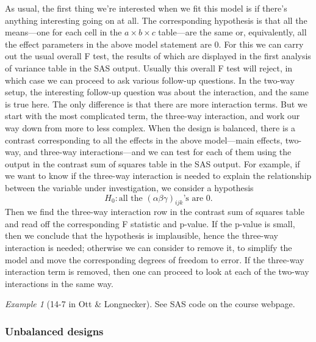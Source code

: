 \documentclass[a4paper, 12pt]{article}
\theoremstyle{plain}
\theoremstyle{definition}
\theoremstyle{remark}
\newtheorem*{example}{Example}
\begin{document}
As usual, the first thing we're interested when we fit this model is if there's anything interesting going on at all.  The corresponding hypothesis is that all the means---one for each cell in the $a \times b \times c$ table---are the same or, equivalently, all the effect parameters in the above model statement are 0.  For this we can carry out the usual overall F test, the results of which are displayed in the first analysis of variance table in the SAS output.  Usually this overall F test will reject, in which case we can proceed to ask various follow-up questions.  In the two-way setup, the interesting follow-up question was about the interaction, and the same is true here.  The only difference is that there are more interaction terms.  But we start with the most complicated term, the three-way interaction, and work our way down from more to less complex.  When the design is balanced, there is a contrast corresponding to all the effects in the above model---main effects, two-way, and three-way interactions---and we can test for each of them using the output in the contrast sum of squares table in the SAS output.  For example, if we want to know if the three-way interaction is needed to explain the relationship between the variable under investigation, we consider a hypothesis 
\[ H_0: \text{all the $(\alpha\beta\gamma)_{ijk}$'s are 0}. \]
Then we find the three-way interaction row in the contrast sum of squares table and read off the corresponding F statistic and p-value.  If the p-value is small, then we conclude that the hypothesis is implausible, hence the three-way interaction is needed; otherwise we can consider to remove it, to simplify the model and move the corresponding degrees of freedom to error.  If the three-way interaction term is removed, then one can proceed to look at each of the two-way interactions in the same way.  

\begin{example}[14-7 in Ott \& Longnecker]
See SAS code on the course webpage.
\end{example}


\subsubsection*{Unbalanced designs}
\end{document}
